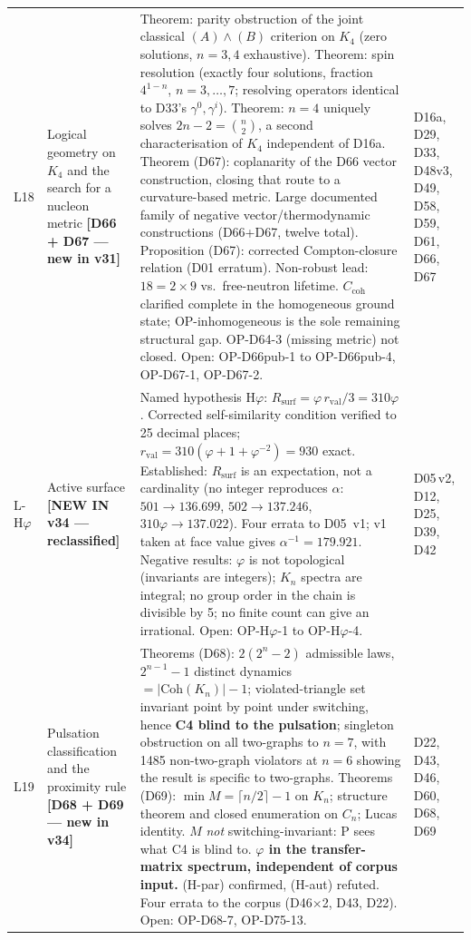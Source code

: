 \documentclass[11pt,a4paper]{article}
\theoremstyle{plain}
\theoremstyle{definition}
\theoremstyle{remark}
\newcommand{\rval}{r_{\mathrm{val}}}
\newcommand{\Rsurf}{R_{\mathrm{surf}}}
\newcommand{\Ccoh}{C_{\mathrm{coh}}}
\begin{document}
\begin{longtable}{L{0.6cm}L{3.0cm}L{5.5cm}L{4.0cm}}
L18 & Logical geometry on $K_4$ and the search for a nucleon metric \textbf{[D66 + D67 --- new in v31]} & \textcolor{proofblue}{Theorem}: parity obstruction of the joint classical $(A)\wedge(B)$ criterion on $K_4$ (zero solutions, $n=3,4$ exhaustive). \textcolor{proofblue}{Theorem}: spin resolution (exactly four solutions, fraction $4^{1-n}$, $n=3,\ldots,7$; resolving operators identical to D33's $\gamma^0,\gamma^i$). \textcolor{proofblue}{Theorem}: $n=4$ uniquely solves $2n-2=\binom{n}{2}$, a second characterisation of $K_4$ independent of D16a. \textcolor{proofblue}{Theorem} (D67): coplanarity of the D66 vector construction, closing that route to a curvature-based metric. Large documented family of negative vector/thermodynamic constructions (D66+D67, twelve total). \textcolor{proofblue}{Proposition} (D67): corrected Compton-closure relation (D01 erratum). Non-robust lead: $18=2\times9$ vs.\ free-neutron lifetime. $\Ccoh$ clarified complete in the homogeneous ground state; OP-inhomogeneous is the sole remaining structural gap. OP-D64-3 (missing metric) not closed. Open: OP-D66pub-1 to OP-D66pub-4, OP-D67-1, OP-D67-2. & D16a, D29, D33, D48v3, D49, D58, D59, D61, D66, D67\\[0.3em]
L-H$\varphi$ & Active surface \textbf{[NEW IN v34 --- reclassified]} & \textcolor{hypothesisorange}{Named hypothesis H$\varphi$}: $\Rsurf=\varphi\,\rval/3=310\varphi$. Corrected self-similarity condition verified to 25 decimal places; $\rval=310(\varphi+1+\varphi^{-2})=930$ exact. \textcolor{proofblue}{Established}: $\Rsurf$ is an expectation, not a cardinality (no integer reproduces $\alpha$: $501\to136.699$, $502\to137.246$, $310\varphi\to137.022$). \textcolor{negativered}{Four errata to D05~v1}; v1 taken at face value gives $\alpha^{-1}=179.921$. \textcolor{negativered}{Negative results}: $\varphi$ is not topological (invariants are integers); $K_n$ spectra are integral; no group order in the chain is divisible by 5; no finite count can give an irrational. Open: OP-H$\varphi$-1 to OP-H$\varphi$-4. & D05\,v2, D12, D25, D39, D42\\[0.3em]
L19 & Pulsation classification and the proximity rule \textbf{[D68 + D69 --- new in v34]} & \textcolor{proofblue}{Theorems} (D68): $2(2^n-2)$ admissible laws, $2^{n-1}-1$ distinct dynamics $=|\mathrm{Coh}(K_n)|-1$; violated-triangle set invariant point by point under switching, hence \textbf{C4 blind to the pulsation}; singleton obstruction on all two-graphs to $n=7$, with 1485 non-two-graph violators at $n=6$ showing the result is specific to two-graphs. \textcolor{proofblue}{Theorems} (D69): $\min M=\lceil n/2\rceil-1$ on $K_n$; structure theorem and closed enumeration on $C_n$; Lucas identity. $M$ \emph{not} switching-invariant: P sees what C4 is blind to. \textbf{$\varphi$ in the transfer-matrix spectrum, independent of corpus input.} (H-par) confirmed, (H-aut) refuted. Four errata to the corpus (D46$\times$2, D43, D22). Open: OP-D68-7, OP-D75-13. & D22, D43, D46, D60, D68, D69\\[0.3em]

\end{longtable}
\end{document}
